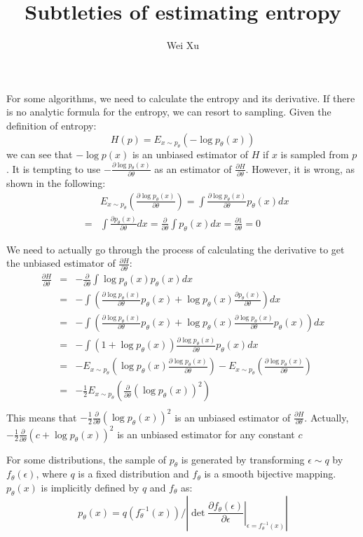 \documentclass{article}
\title{Subtleties of estimating entropy}
\author{Wei Xu}
\newcommand{\pian}[2]{\frac{\partial #1}{\partial #2}}
\begin{document}
	\maketitle

For some algorithms, we need to calculate the entropy and its derivative. If there is no analytic formula for the entropy, we can resort to sampling. Given the definition of entropy:
\begin{equation}
H(p) = E_{x\sim p_\theta}(-\log p_\theta(x))
\end{equation}
we can see that $-\log p(x)$ is an unbiased estimator of $H$ if $x$ is sampled from $p$. It is tempting to use $-\pian{\log p_\theta(x)}{\theta}$ as an estimator of $\pian{H}{\theta}$. However, it is wrong, as shown in the following: 
\begin{eqnarray*}
&&	E_{x\sim p_\theta}\left(\pian{\log p_\theta(x)}{\theta}\right) = \int \pian{\log p_\theta(x)}{\theta} p_\theta(x) dx \\
&=& \int \pian{p_\theta(x)}{\theta} dx = \pian{}{\theta} \int p_\theta(x) dx = \pian{1}{\theta} = 0
\end{eqnarray*}

We need to actually go through the process of calculating the derivative to get the unbiased estimator
of $\pian{H}{\theta}$:
\begin{eqnarray*}
\pian{H}{\theta}&=&-\pian{}{\theta}\int \log p_\theta(x) p_\theta(x) dx \\
&=& - \int \left(\pian{\log p_\theta(x)}{\theta}p_\theta(x) + \log p_\theta(x) \pian{p_\theta(x)}{\theta}\right) dx \\
&=& - \int \left(\pian{\log p_\theta(x)}{\theta}p_\theta(x) + \log p_\theta(x) \pian{\log p_\theta(x)}{\theta} p_\theta(x)\right) dx \\
&=& - \int (1+\log p_\theta(x))\pian{\log p_\theta(x)}{\theta} p_\theta(x) dx \\
&=& -E_{x\sim p_\theta}\left(\log p_\theta(x)\pian{\log p_\theta(x)}{\theta}\right) -E_{x\sim p_\theta}\left(\pian{\log p_\theta(x)}{\theta}\right) \\
&=& -\frac{1}{2}E_{x\sim p_\theta}\left(\pian{}{\theta}(\log p_\theta(x))^2\right) \\
\end{eqnarray*}
This means that $-\frac{1}{2}\pian{}{\theta}(\log p_\theta(x))^2$ is an unbiased estimator of $\pian{H}{\theta}$. Actually, $-\frac{1}{2}\pian{}{\theta}(c+\log p_\theta(x))^2$ is an unbiased
estimator for any constant $c$

For some distributions, the sample of $p_\theta$ is generated by transforming $\epsilon \sim q$ by $f_\theta(\epsilon)$, where $q$ is a fixed distribution and $f_\theta$ is a smooth bijective mapping. $p_\theta(x)$ is implicitly defined by $q$ and $f_\theta$ as:
\[ p_\theta(x) = q(f_\theta^{-1}(x)) / \left|\det \left.\pian{f_\theta(\epsilon)}{\epsilon}\right|_{\epsilon=f_\theta^{-1}(x)}\right|\]
\end{document}

